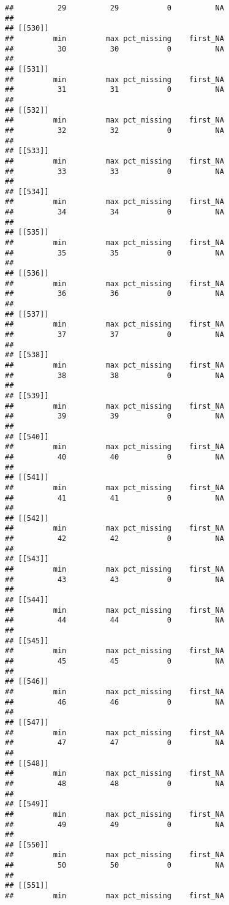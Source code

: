 \documentclass[
]{article}
\begin{document}
\begin{verbatim}
##          29          29           0          NA 
## 
## [[530]]
##         min         max pct_missing    first_NA 
##          30          30           0          NA 
## 
## [[531]]
##         min         max pct_missing    first_NA 
##          31          31           0          NA 
## 
## [[532]]
##         min         max pct_missing    first_NA 
##          32          32           0          NA 
## 
## [[533]]
##         min         max pct_missing    first_NA 
##          33          33           0          NA 
## 
## [[534]]
##         min         max pct_missing    first_NA 
##          34          34           0          NA 
## 
## [[535]]
##         min         max pct_missing    first_NA 
##          35          35           0          NA 
## 
## [[536]]
##         min         max pct_missing    first_NA 
##          36          36           0          NA 
## 
## [[537]]
##         min         max pct_missing    first_NA 
##          37          37           0          NA 
## 
## [[538]]
##         min         max pct_missing    first_NA 
##          38          38           0          NA 
## 
## [[539]]
##         min         max pct_missing    first_NA 
##          39          39           0          NA 
## 
## [[540]]
##         min         max pct_missing    first_NA 
##          40          40           0          NA 
## 
## [[541]]
##         min         max pct_missing    first_NA 
##          41          41           0          NA 
## 
## [[542]]
##         min         max pct_missing    first_NA 
##          42          42           0          NA 
## 
## [[543]]
##         min         max pct_missing    first_NA 
##          43          43           0          NA 
## 
## [[544]]
##         min         max pct_missing    first_NA 
##          44          44           0          NA 
## 
## [[545]]
##         min         max pct_missing    first_NA 
##          45          45           0          NA 
## 
## [[546]]
##         min         max pct_missing    first_NA 
##          46          46           0          NA 
## 
## [[547]]
##         min         max pct_missing    first_NA 
##          47          47           0          NA 
## 
## [[548]]
##         min         max pct_missing    first_NA 
##          48          48           0          NA 
## 
## [[549]]
##         min         max pct_missing    first_NA 
##          49          49           0          NA 
## 
## [[550]]
##         min         max pct_missing    first_NA 
##          50          50           0          NA 
## 
## [[551]]
##         min         max pct_missing    first_NA 

\end{verbatim}
\end{document}
